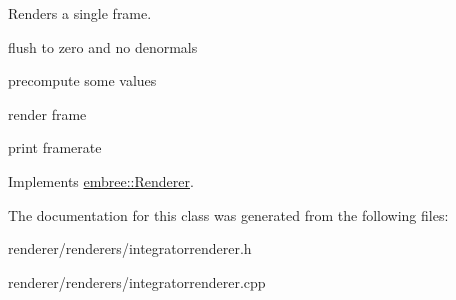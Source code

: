 Renders a single frame. 



flush to zero and no denormals

precompute some values

render frame

print framerate 



Implements \hyperlink{classembree_1_1_renderer_acefb5f55e45bc9b846e1619977926529}{embree::Renderer}.



The documentation for this class was generated from the following files:\begin{DoxyCompactItemize}
\item 
renderer/renderers/integratorrenderer.h\item 
renderer/renderers/integratorrenderer.cpp\end{DoxyCompactItemize}
